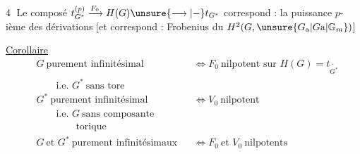 \textcircled{4} Le composé $t_{G^*}^{(p)}\xrightarrow{F_0}H(G)\unsure{\longrightarrow|\mathord{-}}t_{G^*}$ correspond : la puissance $p$-ième des dérivations [et correspond : Frobenius du $H^2(G,\unsure{G_{\mathrm a}|G\mathrm a|\mathbb G_m})$]


\uline{Corollaire}
\[
\begin{aligned}
&G\ \text{purement infinitésimal}&&\Longleftrightarrow F_0\ \text{nilpotent sur }H(G)=t_{\widetilde{G^*}}\\
&\qquad\text{i.e. }G^*\ \text{sans tore}\\
&G^*\ \text{purement infinitésimal}&&\Longleftrightarrow V_0\ \text{nilpotent}\\
&\qquad\text{i.e. }G\ \text{sans composante}\\[-2pt]
&\qquad\qquad\text{torique}\\
&G\ \text{et }G^*\ \text{purement infinitésimaux}&&\Longleftrightarrow F_0\ \text{et }V_0\ \text{nilpotents}
\end{aligned}
\]

